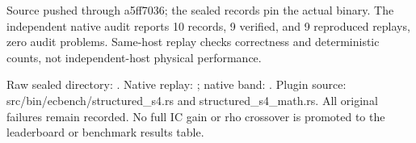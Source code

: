 \documentclass[10pt]{article}
\begin{document}
Source pushed through a5ff7036; the sealed records pin the actual binary.
The independent native audit reports 10 records,
9 verified, and 9 reproduced
replays, zero audit problems. Same-host replay checks correctness and
deterministic counts, not independent-host physical performance.

Raw sealed directory: .
Native replay: ;
native band: .
Plugin source: src/bin/ecbench/structured_s4.rs and structured_s4_math.rs.
All original failures remain recorded. No full IC gain or rho crossover
is promoted to the leaderboard or benchmark results table.
\end{document}
